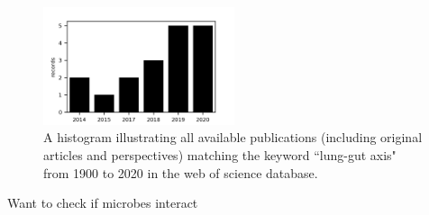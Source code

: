 \begin{figure}[ht]
	\centering
	\includegraphics[width=0.5\textwidth]{./image/bar-papers.png}
	\caption{A histogram illustrating all available publications (including original articles and perspectives) matching the keyword ``lung-gut axis" from 1900 to 2020 in the web of science database.}
	\label{ch2_fig1}
\end{figure}
		









 



Want to check if microbes interact